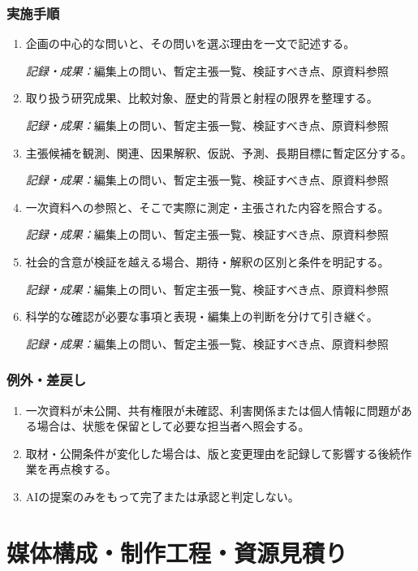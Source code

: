 \documentclass[a4paper,11pt]{article}
\begin{document}
\subsubsection*{実施手順}
\begin{enumerate}[leftmargin=2em,itemsep=0.65em]
\item 企画の中心的な問いと、その問いを選ぶ理由を一文で記述する。\par\noindent\textit{記録・成果：}編集上の問い、暫定主張一覧、検証すべき点、原資料参照\nobreak\smallskip
\item 取り扱う研究成果、比較対象、歴史的背景と射程の限界を整理する。\par\noindent\textit{記録・成果：}編集上の問い、暫定主張一覧、検証すべき点、原資料参照\nobreak\smallskip
\item 主張候補を観測、関連、因果解釈、仮説、予測、長期目標に暫定区分する。\par\noindent\textit{記録・成果：}編集上の問い、暫定主張一覧、検証すべき点、原資料参照\nobreak\smallskip
\item 一次資料への参照と、そこで実際に測定・主張された内容を照合する。\par\noindent\textit{記録・成果：}編集上の問い、暫定主張一覧、検証すべき点、原資料参照\nobreak\smallskip
\item 社会的含意が検証を越える場合、期待・解釈の区別と条件を明記する。\par\noindent\textit{記録・成果：}編集上の問い、暫定主張一覧、検証すべき点、原資料参照\nobreak\smallskip
\item 科学的な確認が必要な事項と表現・編集上の判断を分けて引き継ぐ。\par\noindent\textit{記録・成果：}編集上の問い、暫定主張一覧、検証すべき点、原資料参照\nobreak\smallskip
\end{enumerate}
\subsubsection*{例外・差戻し}
\begin{enumerate}[leftmargin=2em,itemsep=0.35em]
\item 一次資料が未公開、共有権限が未確認、利害関係または個人情報に問題がある場合は、状態を保留として必要な担当者へ照会する。
\item 取材・公開条件が変化した場合は、版と変更理由を記録して影響する後続作業を再点検する。
\item AIの提案のみをもって完了または承認と判定しない。
\end{enumerate}
\section{媒体構成・制作工程・資源見積り}
\end{document}
